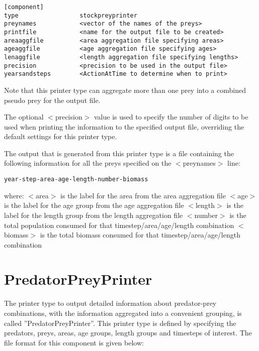 \documentclass[10pt,twoside]{book}
\begin{document}
{\small\begin{verbatim}
[component]
type                 stockpreyprinter
preynames            <vector of the names of the preys>
printfile            <name for the output file to be created>
areaaggfile          <area aggregation file specifying areas>
ageaggfile           <age aggregation file specifying ages>
lenaggfile           <length aggregation file specifying lengths>
precision            <precision to be used in the output file>
yearsandsteps        <ActionAtTime to determine when to print>
\end{verbatim}}

Note that this printer type can aggregate more than one prey into a combined pseudo prey for the output file.

\bigskip
The optional $<$precision$>$ value is used to specify the number of digits to be used when printing the information to the specified output file, overriding the default settings for this printer type.

\bigskip
The output that is generated from this printer type is a file containing the following information for all the preys specified on the $<$preynames$>$ line:

{\small\begin{verbatim}
year-step-area-age-length-number-biomass
\end{verbatim}}

where:\newline
$<$area$>$ is the label for the area from the area aggregation file\newline
$<$age$>$ is the label for the age group from the age aggregation file\newline
$<$length$>$ is the label for the length group from the length aggregation file\newline
$<$number$>$ is the total population consumed for that timestep/area/age/length combination\newline
$<$biomass$>$ is the total biomass consumed for that timestep/area/age/length combination

\section{PredatorPreyPrinter}\label{sec:predatorpreyprinter}
The printer type to output detailed information about predator-prey combinations, with the information aggregated into a convenient grouping, is called ''PredatorPreyPrinter''.  This printer type is defined by specifying the predators, preys, areas, age groups, length groups and timesteps of interest.  The file format for this component is given below:
\end{document}
